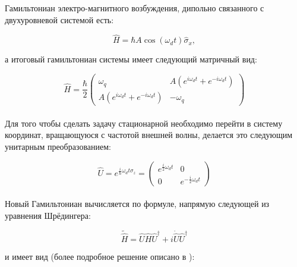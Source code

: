 Гамильтониан электро-магнитного возбуждения, дипольно связанного с двухуровневой системой есть:

\begin{equation}
\tag{12}
\hat H = \hbar A \cos(\omega_d t) \hat\sigma_x , 
\end{equation}

\noindent а итоговый гамильтониан системы имеет следующий матричный вид:

\begin{equation}
\tag{13}
\hat H = \frac{\hbar}{2}\begin{pmatrix} \omega_q & A(e^{i\omega_d t} + e^{-i\omega_d t})\\ A(e^{i\omega_d t} + e^{-i\omega_d t})& -\omega_q \end{pmatrix}
\end{equation}
\\

Для того чтобы сделать задачу стационарной необходимо перейти в систему координат, вращающуюся с частотой внешней волны, делается это следующим унитарным преобразованием:

\begin{equation}
\label{unittr}
\tag{14}
\hat U = e^{\frac{i}{\hbar}\omega_d t\sigma_z}  = \begin{pmatrix}
e^{\frac{i}{2}\omega_d t} & 0 \\0& e^{-\frac{i}{2}\omega_d t}
\end{pmatrix}
\end{equation}
\\

Новый Гамильтониан вычисляется по формуле, напрямую следующей из уравнения Шрёдингера:

\begin{equation}
\tag{15}
\label{rabres}
\tilde{\hat H} = \hat U \hat H \hat U^\dagger+i\dot{\hat U}\hat U^\dagger 
\end{equation}




\noindent и имеет вид (более подробное решение описано в \cite{Gu2017}):

